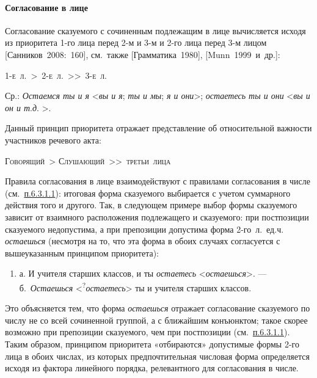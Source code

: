 \paragraph{Согласование в
  лице}\label{ux441ux43eux433ux43bux430ux441ux43eux432ux430ux43dux438ux435-ux432-ux43bux438ux446ux435}

Согласование сказуемого с сочиненным подлежащим в лице вычисляется
исходя из приоритета 1-го лица перед 2-м и 3-м и 2-го лица перед 3-м
лицом {[}Санников~2008:~160{]}, см.~также {[}Грамматика~1980{]},
{[}Munn~1999~и~др.{]}:

\textsc{1-е~л.~\textgreater~2-е~л.~\textgreater\textgreater~3-е~л.}

Ср.: \textit{Остаемся ты и я} \textless{}\textit{вы и я}; \textit{ты и мы};
\textit{я и они}\textgreater; \textit{остаетесь ты и они}
\textless{}\textit{вы и он и т}.\textit{д}. \textgreater.

Данный принцип приоритета отражает представление об относительной
важности участников речевого акта:

\textsc{Говорящий~\textgreater{}
  Слушающий~\textgreater\textgreater~третьи~лица}

Правила согласования в лице взаимодействуют с правилами согласования в
числе (см.~\underline{п.6.3.1.1}): итоговая форма сказуемого выбирается
с учетом суммарного действия того и другого. Так, в следующем примере
выбор формы сказуемого зависит от взаимного расположения подлежащего и
сказуемого: при постпозиции сказуемого недопустима, а при препозиции
допустима форма 2-го~л.~ед.ч. \textit{остаешься} (несмотря на то, что эта
форма в обоих случаях согласуется с вышеуказанным принципом приоритета):

\begin{enumerate}
  \def\labelenumi{(\arabic{enumi})}
  \setcounter{enumi}{122}
  \item
        а. И учителя старших классов, и ты \textit{остаетесь}
        \textless*\textit{остаешься}\textgreater. --- б.~\textit{Остаешься}
        \textless{}\textsuperscript{?}\textit{остаетесь}\textgreater{} ты и
        учителя старших классов.
\end{enumerate}

Это объясняется тем, что форма \textit{остаешься} отражает согласование
сказуемого по числу не со всей сочиненной группой, а с ближайшим
конъюнктом; такое скорее возможно при препозиции сказуемого, чем при
постпозиции (см.~\underline{п.6.3.1.1}). Таким образом, принципом
приоритета «отбираются» допустимые формы 2-го лица в обоих числах, из
которых предпочтительная числовая форма определяется исходя из фактора
линейного порядка, релевантного для согласования в числе.

